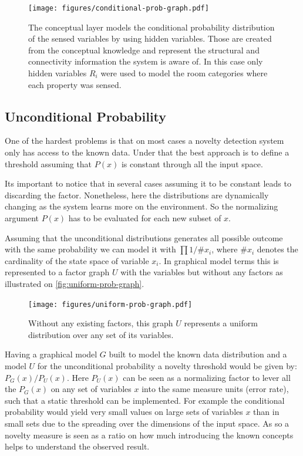 \documentclass[runningheads,a4paper]{llncs}
\begin{document}
\begin{figure}[h]
\centering
\texttt{[image: figures/conditional-prob-graph.pdf]}
\caption{\label{fig:conditional-prob-graph}The conceptual layer models the conditional
         probability distribution of the sensed variables by using hidden variables.
         Those are created from the conceptual knowledge and represent the structural
         and connectivity information the system is aware of.
         In this case only hidden variables $R_i$ were used to model the room categories
         where each property was sensed.}
\end{figure}

\subsection{Unconditional Probability}
\label{sec:unconditional-prob}
One of the hardest problems is that on most cases a novelty detection system only
has access to the known data.
Under that the best approach is to define a threshold assuming that $P(x)$ is
constant through all the input space.

Its important to notice that in several cases assuming it to be constant leads to
discarding the factor.
Nonetheless, here the distributions are dynamically changing as the system learns
more on the environment.
So the normalizing argument $P(x)$ has to be evaluated for each new subset of $x$.

Assuming that the unconditional distributions generates all possible outcome with
the same probability we can model it with $\prod{1/\# x_i}$,
where $\# x_i$ denotes the cardinality of the state space of variable $x_i$.
In graphical model terms this is represented to a factor graph $U$ with the
variables but without any factors as illustrated on \autoref{fig:uniform-prob-graph}.

\begin{figure}
\centering
\texttt{[image: figures/uniform-prob-graph.pdf]}
\caption{\label{fig:uniform-prob-graph}Without any existing factors, this graph $U$ represents a
         uniform distribution over any set of its variables.}
\end{figure}

Having a graphical model $G$ built to model the known data distribution and a model
$U$ for the unconditional probability a novelty threshold would be given by:
$P_G(x)/P_U(x)$.
Here $P_{U}(x)$ can be seen as a normalizing factor to lever all the $P_G(x)$ on any set of
variables $x$ into the same measure units (error rate), such that a static threshold can be implemented.
For example the conditional probability would yield very small values on large sets of variables
$x$ than in small sets due to the spreading over the dimensions of the input space.
As so a novelty measure is seen as a ratio on how much introducing the known concepts helps to
understand the observed result.
\end{document}
